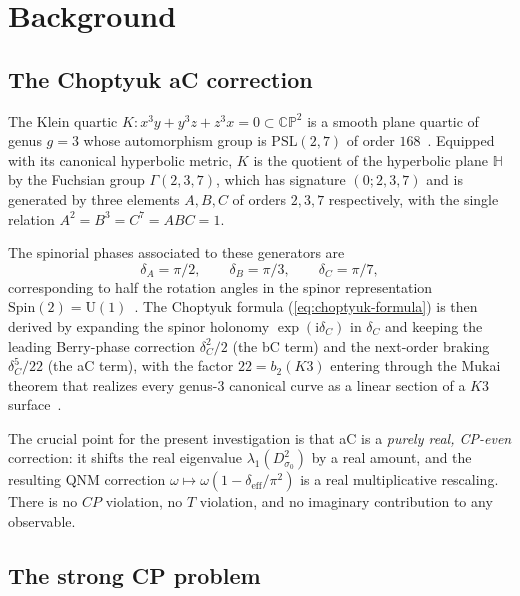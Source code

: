 \documentclass[11pt,a4paper]{article}
\newcommand{\dC}{\delta_C}
\newcommand{\aC}{a\text{-}C}
\newcommand{\bC}{b\text{-}C}
\newcommand{\deff}{\delta_{\mathrm{eff}}}
\newcommand{\PSL}{\mathrm{PSL}}
\newcommand{\Spin}{\mathrm{Spin}}
\providecommand{\ii}{}
\renewcommand{\ii}{\mathrm{i}}
\theoremstyle{plain}
\theoremstyle{definition}
\theoremstyle{remark}
\begin{document}
\section{Background}\label{sec:background}

\subsection{The Choptyuk \aC{} correction}\label{ssec:aC}

The Klein quartic $K\colon x^3 y + y^3 z + z^3 x = 0 \subset \mathbb{CP}^2$
is a smooth plane quartic of genus $g=3$ whose automorphism group
is $\PSL(2,7)$ of order $168$~\cite{klein1879,elkies1998klein}.  Equipped
with its canonical hyperbolic metric, $K$ is the quotient of the
hyperbolic plane $\mathbb{H}$ by the Fuchsian group
$\Gamma(2,3,7)$, which has signature $(0;2,3,7)$ and is generated by
three elements $A,B,C$ of orders $2,3,7$ respectively, with the single
relation $A^2 = B^3 = C^7 = ABC = 1$.

The spinorial phases associated to these generators are
\begin{equation}
  \delta_A = \pi/2, \qquad \delta_B = \pi/3, \qquad \dC = \pi/7,
\end{equation}
corresponding to half the rotation angles in the spinor representation
$\Spin(2) = \mathrm{U}(1)$~\cite{isaev2024spinor}.  The Choptyuk formula
(\ref{eq:choptyuk-formula}) is then derived by expanding the spinor
holonomy $\exp(\ii\dC)$ in $\dC$ and keeping the leading Berry-phase
correction $\dC^2/2$ (the \bC{} term) and the next-order braking
$\dC^5/22$ (the \aC{} term), with the factor $22 = b_2(K3)$ entering
through the Mukai theorem that realizes every genus-$3$ canonical curve
as a linear section of a $K3$ surface~\cite{mukai1988k3}.

The crucial point for the present investigation is that \aC{} is a
\emph{purely real, CP-even} correction: it shifts the real eigenvalue
$\lambda_1(D^2_{\sigma_0})$ by a real amount, and the resulting QNM
correction $\omega\mapsto \omega(1-\deff/\pi^2)$ is a real multiplicative
rescaling.  There is no $CP$ violation, no $T$ violation, and no
imaginary contribution to any observable.

\subsection{The strong CP problem}\label{ssec:cp}
\end{document}
